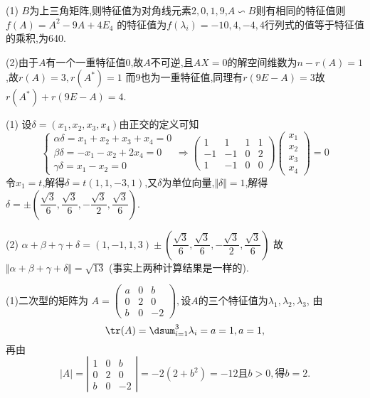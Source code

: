 \documentclass[UTF8]{article}
\begin{document}
(1)
$B$为上三角矩阵,则特征值为对角线元素$2,0,1,9$,$A\backsim B$则有相同的特征值则$f(A)=A^2-9A+4E_4$
的特征值为$f(\lambda_i)=-10,4,-4,4$行列式的值等于特征值的乘积,为640.\par
(2)由于$A$有一个一重特征值0,故$A$不可逆,且$AX=0$的解空间维数为$n-r(A)=1$,故$r(A)=3,r(A^*)=1$
而9也为一重特征值,同理有$r(9E-A)=3$故$r(A^*)+r(9E-A)=4$.
\par
{}
(1)
设$\delta=(x_1,x_2,x_3,x_4)$由正交的定义可知
\begin{equation*}\begin{cases}
    \alpha\delta=x_1+x_2+x_3+x_4=0\\
    \beta\delta=-x_1-x_2+2x_4=0\\
    \gamma\delta=x_1-x_2=0
\end{cases}\Rightarrow\left(\begin{matrix}
    1&1&1&1\\-1&-1&0&2\\1&-1&0&0
\end{matrix}\right)\left(\begin{matrix}
    x_1\\x_2\\x_3\\x_4
\end{matrix}\right)=0
\end{equation*}
 令$x_1=t$,解得$\delta=t(1,1,-3,1)$,又$\delta$为单位向量,$\Vert \delta \Vert=1 $,解得
 $\delta=\pm\left(\dfrac{\sqrt{3}}{6},\dfrac{\sqrt{3}}{6},-\dfrac{\sqrt{3}}{2},\dfrac{\sqrt{3}}{6}\right)$.
 \par
 (2)
$\alpha+\beta+\gamma+\delta=
\left(1,-1,1,3\right)\pm
\left(\dfrac{\sqrt{3}}{6},\dfrac{\sqrt{3}}{6},-\dfrac{\sqrt{3}}{2},\dfrac{\sqrt{3}}{6}\right)$
故$\Vert\alpha+\beta+\gamma+\delta\Vert=\sqrt{13}$
(事实上两种计算结果是一样的).
\par
{}
(1)二次型的矩阵为
$A=\left(\begin{matrix}
    a&0&b\\0&2&0\\b&0&-2
\end{matrix}\right),
\text{设$A$的三个特征值为$\lambda_1,\lambda_2,\lambda_3$}$,
由
 \begin{equation*} \tr (A)=\dsum_{i=1}^{3}\lambda_i=a=1,a=1,\end{equation*}
再由
\begin{equation*}
    \vert A\vert=\left\lvert
\begin{matrix}
    1&0&b\\0&2&0\\b&0&-2
\end{matrix}\right\lvert =-2(2+b^2)=-12\text{且}b>0,\text{得}b=2.
\end{equation*}
\end{document}
